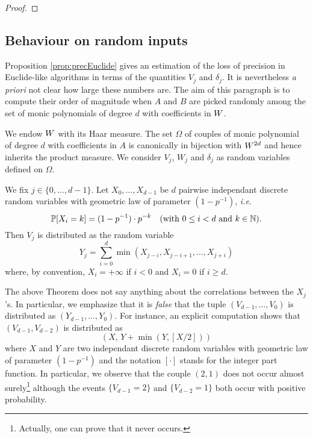 \documentclass{sig-alternate}
\begin{document}
\begin{proof}
\end{proof}

\begin{rem}
\end{rem}

\subsection{Behaviour on random inputs}

Proposition \ref{prop:precEuclide} gives an estimation of the loss
of precision in Euclide-like algorithms in terms of the quantities
$V_j$ and $\delta_j$. It is nevertheless \emph{a priori} not clear
how large these numbers are. The aim of this paragraph is to compute
their order of magnitude when $A$ and $B$ are picked randomly among
the set of monic polynomials of degree $d$ with coefficients in $W$.

We endow $W$ with its Haar measure. The set $\Omega$ of couples of 
monic polynomial of degree $d$ with coefficients in $A$ is canonically 
in bijection with $W^{2d}$ and hence inherits the product measure. 
We consider $V_j$, $W_j$ and $\delta_j$ as random variables defined on 
$\Omega$.

\begin{theo}
\label{th:lawVj}
We fix $j \in \{0, \ldots, d-1\}$.
Let $X_0, \ldots, X_{d-1}$ be $d$ pairwise independant discrete random 
variables with geometric law of parameter $(1 - p^{-1})$, \emph{i.e.}
$$\mathbb P[X_i = k] = (1 - p^{-1}) \cdot p^{-k} \quad 
\text{(with } 0 \leq i < d \text{ and } k \in \mathbb N \text{)}.$$
Then $V_j$ is distributed as the random variable
$$Y_j = \sum_{i=0}^d \min(X_{j-i}, X_{j-i+1}, \ldots, X_{j+i})$$
where, by convention, $X_i = +\infty$ if $i < 0$ and $X_i = 0$ if 
$i \geq d$.
\end{theo}

\begin{rem}
The above Theorem does not say anything about the correlations between
the $X_j$'s. In particular, we emphasize that it is \emph{false} that
the tuple $(V_{d-1}, \ldots, V_0)$ is distributed as $(Y_{d-1}, \ldots,
Y_0)$. For instance, an explicit computation shows that $(V_{d-1}, 
V_{d-2})$ is distributed as 
$$(X, \, Y + \min(Y, [X/2]))$$
where $X$ and $Y$ are two independant discrete random variables with 
geometric law of parameter $(1 - p^{-1})$ and the notation $[\cdot]$ 
stands for the integer part function. In particular, we observe that 
the couple $(2,1)$ does not occur almost surely\footnote{Actually, one
can prove that it never occurs.} although the events $\{V_{d-1} = 2\}$ 
and $\{V_{d-2} = 1\}$ both occur with positive probability.
\end{rem}
\end{document}
